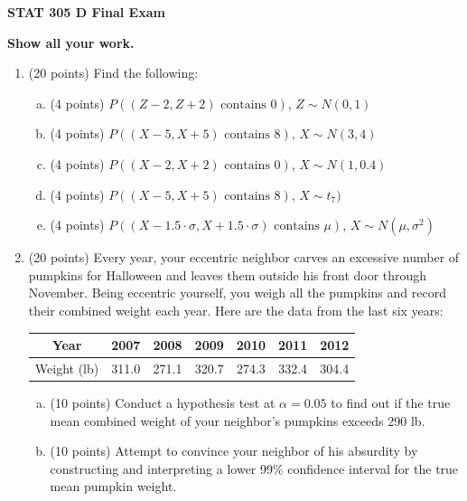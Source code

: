 \documentclass{article}\usepackage{graphicx, color}
\numberwithin{equation}{section}
\begin{document}
\begin{flushleft}


\Huge
\begin{center}
{\bf STAT 305 D Final Exam}
\end{center} 
\huge
\begin{center}
{\bf Show all your work.}
\end{center}

\normalsize
\begin{enumerate}[1. ]

\item (20 points) Find the following:

\begin{enumerate}[a. ]
\item (4 points) $P((Z - 2, Z + 2) \text{ contains } 0)$, $Z \sim N(0,1)$
\item (4 points) $P((X - 5, X + 5) \text{ contains } 8)$, $X \sim N(3,4)$
\item (4 points) $P((X - 2, X + 2) \text{ contains } 0)$, $X \sim N(1,0.4)$
\item (4 points) $P((X - 5, X + 5) \text{ contains } 8)$, $X \sim t_7)$
\item (4 points) $P((X - 1.5 \cdot \sigma, X + 1.5 \cdot \sigma) \text{ contains } \mu)$, $X \sim N(\mu,\sigma^2)$
\end{enumerate}


\item (20 points) Every year, your eccentric neighbor carves an excessive number of pumpkins for Halloween and leaves them outside his front door through November. Being eccentric yourself, you weigh all the pumpkins and record their combined weight each year. Here are the data from the last six years: 

\begin{center}
\begin{tabular}{c|cccccc}
Year & 2007 & 2008 & 2009 & 2010 & 2011 & 2012 \\ \hline
Weight (lb) & 311.0 & 271.1 & 320.7 & 274.3 & 332.4 & 304.4   \\ 
\end{tabular}
\end{center}

\begin{enumerate}[a. ]
\item (10 points) Conduct a hypothesis test at $\alpha = 0.05$ to find out if the true mean combined weight of your neighbor's pumpkins exceeds 290 lb.
\item (10 points) Attempt to convince your neighbor of his absurdity by constructing and interpreting a lower 99\% confidence interval for the true mean pumpkin weight.
\end{enumerate}



\end{enumerate}
\end{flushleft}
\end{document}
